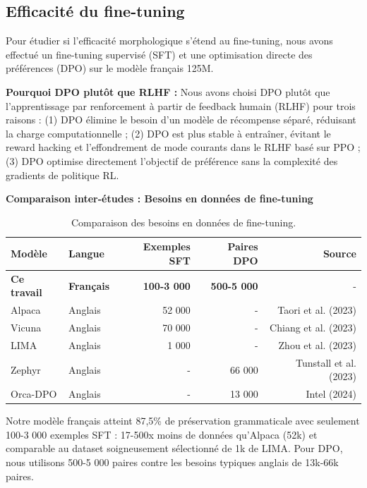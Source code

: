 \documentclass[11pt,a4paper]{article}
\begin{document}
\subsection{Efficacité du fine-tuning}

Pour étudier si l'efficacité morphologique s'étend au fine-tuning, nous avons effectué un fine-tuning supervisé (SFT) et une optimisation directe des préférences (DPO) sur le modèle français 125M.

\textbf{Pourquoi DPO plutôt que RLHF :} Nous avons choisi DPO plutôt que l'apprentissage par renforcement à partir de feedback humain (RLHF) pour trois raisons : (1) DPO élimine le besoin d'un modèle de récompense séparé, réduisant la charge computationnelle ; (2) DPO est plus stable à entraîner, évitant le reward hacking et l'effondrement de mode courants dans le RLHF basé sur PPO ; (3) DPO optimise directement l'objectif de préférence sans la complexité des gradients de politique RL.

\textbf{Comparaison inter-études : Besoins en données de fine-tuning}

\begin{table}[H]
\centering
\begin{tabular}{llrrr}
\toprule
\textbf{Modèle} & \textbf{Langue} & \textbf{Exemples SFT} & \textbf{Paires DPO} & \textbf{Source} \\
\midrule
\textbf{Ce travail} & \textbf{Français} & \textbf{100-3 000} & \textbf{500-5 000} & - \\
Alpaca & Anglais & 52 000 & - & Taori et al. (2023) \\
Vicuna & Anglais & 70 000 & - & Chiang et al. (2023) \\
LIMA & Anglais & 1 000 & - & Zhou et al. (2023) \\
Zephyr & Anglais & - & 66 000 & Tunstall et al. (2023) \\
Orca-DPO & Anglais & - & 13 000 & Intel (2024) \\
\bottomrule
\end{tabular}
\caption{Comparaison des besoins en données de fine-tuning.}
\label{tab:finetuning}
\end{table}

Notre modèle français atteint 87,5\% de préservation grammaticale avec seulement 100-3 000 exemples SFT : 17-500x moins de données qu'Alpaca (52k) et comparable au dataset soigneusement sélectionné de 1k de LIMA. Pour DPO, nous utilisons 500-5 000 paires contre les besoins typiques anglais de 13k-66k paires.
\end{document}
